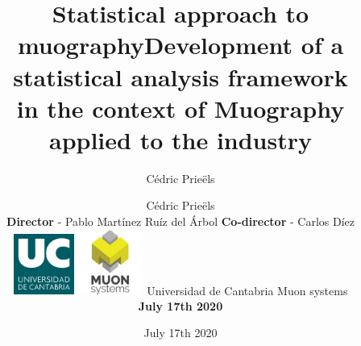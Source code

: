 \documentclass[handout,8 pt]{beamer}
\title{Statistical approach to muography}
\date{July 17th 2020}
\author{C\'{e}dric Prie\"els}
\begin{document}
\begin{frame}
\vspace{-15pt} 
\title{Development of a statistical analysis framework \\ in the context of Muography applied to the industry}
\author{C\'{e}dric Prie\"els \\ \vspace{10pt} \textbf{Director} - Pablo Mart\'inez Ru\'iz del \'Arbol \newline \textbf{Co-director} - Carlos D\'iez \\ \vspace{20pt} \includegraphics[width= 0.15\textwidth]{figs/image_UC.png} \hspace{10pt} \includegraphics[width= 0.16\textwidth]{figs/muonSystems.png} \newline \vspace{20pt} Universidad de Cantabria \newline Muon systems \newline  \begin{center} \large{\textbf{July 17th 2020}} \end{center}}

\date{}
\vspace{15pt}
\maketitle

\centering
  
\end{frame}
\end{document}
